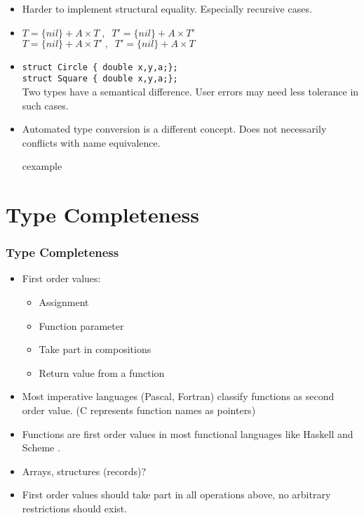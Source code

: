 
\begin{frame}
 \begin{itemize}[<+->]
  \item Harder to implement structural equality. Especially recursive cases.
  \item $T = \{nil\} +A\times T\;,\;\;T' = \{nil\} + A\times T'$ \\ \pause
	$T = \{nil\} +A\times T'\;,\;\;T' = \{nil\} + A\times T$ 
  \item \texttt{struct Circle \{ double x,y,a;\};} \\
	\texttt{struct Square \{ double x,y,a;\};} \\
	Two types have a semantical difference. User errors may need less tolerance in such
	cases.
 \item Automated type conversion is a different concept. Does not necessarily conflicts with name
 equivalence.
\begin{beamercolorbox}{cexample}
\codeisimcev
\end{beamercolorbox}
 \end{itemize}
\end{frame}

\section{Type Completeness}
\begin{frame}
 \frametitle{Type Completeness}
\begin{itemize}[<+->]
 \item First order values:
	\begin{itemize}
	\item Assignment
	\item Function parameter
	\item Take part in compositions
	\item Return value from a function
	\end{itemize}
 \item Most imperative languages (Pascal, Fortran) classify functions as second order value. (C
 represents function names as pointers)
 \item Functions are first order values in most functional languages like Haskell and Scheme .
 \item Arrays, structures (records)?
 \item {} First order values should take part in all
 operations above, no arbitrary restrictions should exist.
\end{itemize}
\end{frame}

